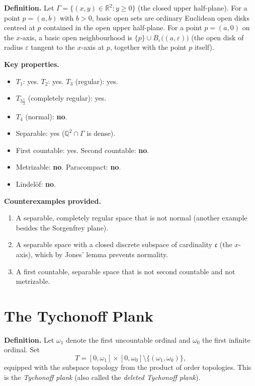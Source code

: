 \documentclass[11pt,a4paper,twoside]{book}
\theoremstyle{remark}
\theoremstyle{definition}
\theoremstyle{definition}
\begin{document}
\textbf{Definition.}
Let $\Gamma = \{(x,y)\in\mathbb{R}^2 : y\ge 0\}$ (the closed upper
half-plane).  For a point $p=(a,b)$ with $b>0$, basic open sets are
ordinary Euclidean open disks centred at $p$ contained in the open
upper half-plane.  For a point $p=(a,0)$ on the $x$-axis, a basic
open neighbourhood is $\{p\}\cup B_\varepsilon\bigl((a,\varepsilon)\bigr)$
(the open disk of radius $\varepsilon$ tangent to the $x$-axis at $p$,
together with the point $p$ itself).

\medskip
\textbf{Key properties.}
\begin{itemize}
  \item $T_1$: yes. \quad $T_2$: yes. \quad $T_3$ (regular): yes.
  \item $T_{3\frac{1}{2}}$ (completely regular): yes.
  \item $T_4$ (normal): \textbf{no}.
  \item Separable: yes ($\mathbb{Q}^2\cap\Gamma$ is dense).
  \item First countable: yes. \quad Second countable: \textbf{no}.
  \item Metrizable: \textbf{no}. \quad Paracompact: \textbf{no}.
  \item Lindel\"of: \textbf{no}.
\end{itemize}

\textbf{Counterexamples provided.}
\begin{enumerate}
  \item A separable, completely regular space that is not normal
        (another example besides the Sorgenfrey plane).
  \item A separable space with a closed discrete subspace of
        cardinality $\mathfrak{c}$ (the $x$-axis), which by Jones'
        lemma prevents normality.
  \item A first countable, separable space that is not second countable
        and not metrizable.
\end{enumerate}

\section{The Tychonoff Plank}
\label{app:tychonoff-plank}

\textbf{Definition.}
Let $\omega_1$ denote the first uncountable ordinal and $\omega_0$ the
first infinite ordinal.  Set
\[
  T = [0,\omega_1]\times[0,\omega_0]
      \setminus\{(\omega_1,\omega_0)\},
\]
equipped with the subspace topology from the product of order
topologies.  This is the \emph{Tychonoff plank} (also called the
\emph{deleted Tychonoff plank}).
\end{document}
